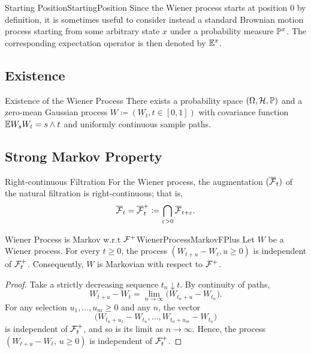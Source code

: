 \begin{xtip}{Starting Position}{StartingPosition}
	Since the Wiener process starts at position \(0\) by definition, it is sometimes useful to consider instead a standard Brownian motion process starting from some arbitrary state \(x\) under a probability measure \(\mathbb{P}^x\). The corresponding expectation operator is then denoted by \(\mathbb{E}^x\).
\end{xtip}
\subsection{Existence}

\begin{thm}{Existence of the Wiener Process}{}
	There exists a probability space \((\Omega, \mathcal{H}, \mathbb{P})\) and a zero-mean Gaussian process \(W \coloneqq (W_t, t \in [0, 1])\) with covariance function \(\mathbb{E} W_s W_t = s \wedge t\) and uniformly continuous sample paths.
\end{thm}

\subsection{Strong Markov Property}


\begin{thm}{Right-continuous Filtration}{}
	For the Wiener process, the augmentation \((\overline{\mathcal{F}}_t)\) of the natural filtration is right-continuous; that is,
	\begin{equation*}
		\overline{\mathcal{F}}_t = \overline{\mathcal{F}}_t^+ \coloneqq \bigcap_{\varepsilon > 0} \overline{\mathcal{F}}_{t+\varepsilon}.
	\end{equation*}
\end{thm}

\begin{thm}{Wiener Process is Markov w.r.t \(\mathcal{F}^+\)}{WienerProcessMarkovFPlus}
	Let \(W\) be a Wiener process. For every \(t \ge 0\), the process \((W_{t+u} - W_t, u \ge 0)\) is independent of \(\mathcal{F}_t^+\). Consequently, \(W\) is Markovian with respect to \(\mathcal{F}^+\).
\end{thm}

\begin{proof}
    Take a strictly decreasing sequence \(t_n \downarrow t\). By continuity of paths,
    \[
        W_{t+u} - W_t = \lim_{n \to \infty} \big(W_{t_n+u} - W_{t_n}\big).
    \]
    For any selection \(u_1, \ldots, u_m \ge 0\) and any \(n\), the vector
    \[
        \big(W_{t_n+u_1} - W_{t_n}, \ldots, W_{t_n+u_m} - W_{t_n}\big)
    \]
    is independent of \(\mathcal{F}_t^+\), and so is its limit as \(n \to \infty\). Hence, the process \((W_{t+u} - W_t,\, u \ge 0)\) is independent of \(\mathcal{F}_t^+\).
\end{proof}

